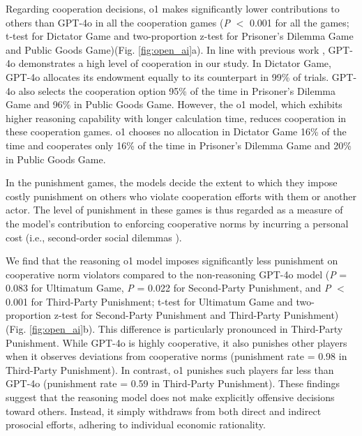 Regarding cooperation decisions, o1 makes significantly lower contributions to others than GPT-4o in all the cooperation games (\textit{P} $<$ 0.001 for all the games; t-test for Dictator Game and two-proportion z-test for Prisoner's Dilemma Game and Public Goods Game)(Fig. \ref{fig:open_ai}a). 
In line with previous work \cite{fontana2024nicer, wu2024shall, vallinder2024cultural}, GPT-4o demonstrates a high level of cooperation in our study.
In Dictator Game, GPT-4o allocates its endowment equally to its counterpart in 99\% of trials.
GPT-4o also selects the cooperation option 95\% of the time in Prisoner's Dilemma Game and 96\% in Public Goods Game.
However, the o1 model, which exhibits higher reasoning capability with longer calculation time, reduces cooperation in these cooperation games.
o1 chooses no allocation in Dictator Game 16\% of the time and cooperates only 16\% of the time in Prisoner's Dilemma Game and 20\% in Public Goods Game. 


In the punishment games, the models decide the extent to which they impose costly punishment on others who violate cooperation efforts with them or another actor.
The level of punishment in these games is thus regarded as a measure of the model’s contribution to enforcing cooperative norms by incurring a personal cost (i.e., second-order social dilemmas \cite{heckathorn1989collective}).

We find that the reasoning o1 model imposes significantly less punishment on cooperative norm violators compared to the non-reasoning GPT-4o model (\textit{P} = 0.083 for Ultimatum Game, \textit{P} = 0.022 for Second-Party Punishment, and \textit{P} $<$ 0.001 for Third-Party Punishment; t-test for Ultimatum Game and two-proportion z-test for Second-Party Punishment and Third-Party Punishment) (Fig. \ref{fig:open_ai}b).
This difference is particularly pronounced in Third-Party Punishment.
While GPT-4o is highly cooperative, it also punishes other players when it observes deviations from cooperative norms (punishment rate = 0.98 in Third-Party Punishment).
In contrast, o1 punishes such players far less than GPT-4o (punishment rate = 0.59 in Third-Party Punishment).
These findings suggest that the reasoning model does not make explicitly offensive decisions toward others.
Instead, it simply withdraws from both direct and indirect prosocial efforts, adhering to individual economic rationality.

